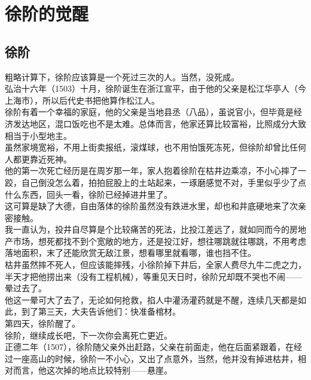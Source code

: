 \section{徐阶的觉醒}
\ifnum{}
	\begin{multicols}{\theparacolNo}
\fi
\subsection{徐阶}
粗略计算下，徐阶应该算是一个死过三次的人。当然，没死成。\\

弘治十六年（1503）十月，徐阶诞生在浙江宣平，由于他的父亲是松江华亭人（今上海市），所以后代史书把他算作松江人。\\

徐阶有着一个幸福的家庭，他的父亲是当地县丞（八品），虽说官小，但毕竟是经济发达地区，混口饭吃也不是太难。总体而言，他家还算比较富裕，比照成分大致相当于小型地主。\\

虽然家境宽裕，不用上街卖报纸，滚煤球，也不用怕饿死冻死，但徐阶却曾比任何人都更靠近死神。\\

他的第一次死亡经历是在周岁那一年，家人抱着徐阶在枯井边乘凉，不小心摔了一跤，自己倒没怎么着，拍拍屁股上的土站起来，一琢磨感觉不对，手里似乎少了点什么东西，回头一看，徐阶已经掉进井里了。\\

这可算是缺了大德，自由落体的徐阶虽然没有跌进水里，却也和井底硬地来了次亲密接触。\\

我一直认为，投井自尽算是个比较痛苦的死法，比投江差远了，就如同而今的房地产市场，想死都找不到个宽敞的地方，还是投江好，想往哪跳就往哪跳，不用考虑落地面积，末了还能欣赏无敌江景，想看哪里就看哪，谁也挡不住。\\

枯井虽然摔不死人，但应该能摔残，小徐阶掉下井后，全家人费尽九牛二虎之力，半天才把他捞出来（没有工程机械），等重见天日时，徐阶兄却既不哭也不闹——晕过去了。\\

他这一晕可大了去了，无论如何抢救，掐人中灌汤灌药就是不醒，连续几天都是如此，到了第三天，大夫告诉他们：快准备棺材。\\

第四天，徐阶醒了。\\

徐阶，继续成长吧，下一次你会离死亡更近。\\

正德二年（1507），徐阶随父亲外出赶路，父亲在前面走，他在后面紧跟着，在经过一座高山的时候，徐阶一不小心，又出了点意外，当然，他并没有掉进枯井，相对而言，他这次掉的地点比较特别——悬崖。\\


\end{multicols}
